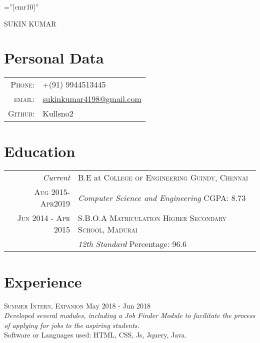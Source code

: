 \documentclass[a4paper,10pt]{article}
\begin{document}

\pagestyle{empty} %

\font\fb=''[cmr10]'' %

\par{\centering
		{\Huge SUKIN \textsc{KUMAR}
	}\bigskip\par}

\section{Personal Data}

\begin{tabular}{rl}
    \textsc{Phone:}     & +(91) 9944513445\\
    \textsc{email:}     &
    \href{mailto:kullsno2@gmail.com}{sukinkumar4198@gmail.com}\\
    \textsc{Github:}    & Kullsno2
\end{tabular}

\section{Education}
\begin{tabular}{r|p{11cm}}
 \emph{Current} & B.E at \textsc{College of Engineering Guindy, Chennai}\\\textsc{Aug 2015-Apr2019}&\emph{Computer Science and Engineering} {} \hfill CGPA: 8.73\multicolumn{2}{c}{}\\
 \textsc{Jun 2014 - Apr 2015} & \textsc{S.B.O.A Matriculation Higher Secondary School, Madurai}\\ &\emph{12th Standard}    \hfill Percentage: 96.6\multicolumn{2}{c}{}
\end{tabular}

\section{Experience}
{\textsc{Summer Intern, Expanion} \hfill May 2018 - Jun 2018 \\
\emph{Developed several modules, including a Job Finder Module to facilitate the process of applying for jobs to the aspiring students.}\\
Software or Languages used: HTML, CSS, Js, Jquery, Java.} \\
\end{document}
